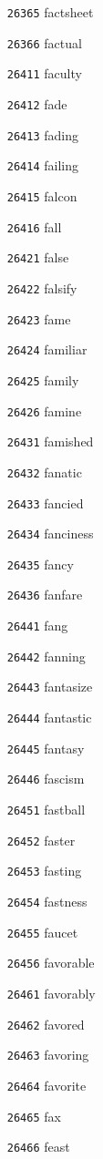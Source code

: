 \documentclass[twoside,11pt]{article}
\begin{document}
\begin{multicols}{5}
\begin{enumerate}
\item[\texttt{26365}] factsheet
\item[\texttt{26366}] factual
\item[\texttt{26411}] faculty
\item[\texttt{26412}] fade
\item[\texttt{26413}] fading
\item[\texttt{26414}] failing
\item[\texttt{26415}] falcon
\item[\texttt{26416}] fall
\item[\texttt{26421}] false
\item[\texttt{26422}] falsify
\item[\texttt{26423}] fame
\item[\texttt{26424}] familiar
\item[\texttt{26425}] family
\item[\texttt{26426}] famine
\item[\texttt{26431}] famished
\item[\texttt{26432}] fanatic
\item[\texttt{26433}] fancied
\item[\texttt{26434}] fanciness
\item[\texttt{26435}] fancy
\item[\texttt{26436}] fanfare
\item[\texttt{26441}] fang
\item[\texttt{26442}] fanning
\item[\texttt{26443}] fantasize
\item[\texttt{26444}] fantastic
\item[\texttt{26445}] fantasy
\item[\texttt{26446}] fascism
\item[\texttt{26451}] fastball
\item[\texttt{26452}] faster
\item[\texttt{26453}] fasting
\item[\texttt{26454}] fastness
\item[\texttt{26455}] faucet
\item[\texttt{26456}] favorable
\item[\texttt{26461}] favorably
\item[\texttt{26462}] favored
\item[\texttt{26463}] favoring
\item[\texttt{26464}] favorite
\item[\texttt{26465}] fax
\item[\texttt{26466}] feast

\end{enumerate}
\end{multicols}
\end{document}

